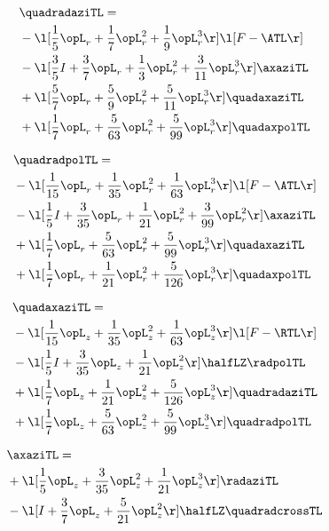 \begin{alignat}{2} 
\label{eq:quadradaziTL_0} 
& \quadradaziTL = \\ 
& - \l[ \frac{1}{5} \opL_r + \frac{1}{7} \opL_r^{2} + \frac{1}{9} \opL_r^{3}  \r] \l[ F - \ATL \r] \nonumber \\ 
& - \l[ \frac{3}{5} I + \frac{3}{7} \opL_r + \frac{1}{3} \opL_r^{2} + \frac{3}{11} \opL_r^{3}  \r] \axaziTL \nonumber \\ 
& + \l[ \frac{5}{7} \opL_r + \frac{5}{9} \opL_r^{2} + \frac{5}{11} \opL_r^{3}  \r] \quadaxaziTL \nonumber \\ 
& + \l[ \frac{1}{7} \opL_r + \frac{5}{63} \opL_r^{2} + \frac{5}{99} \opL_r^{3}  \r] \quadaxpolTL \nonumber \\ 
\end{alignat} 


\begin{alignat}{2} 
\label{eq:quadradpolTL_0} 
& \quadradpolTL = \\ 
& - \l[ \frac{1}{15} \opL_r + \frac{1}{35} \opL_r^{2} + \frac{1}{63} \opL_r^{3}  \r] \l[ F - \ATL \r] \nonumber \\ 
& - \l[ \frac{1}{5} I + \frac{3}{35} \opL_r + \frac{1}{21} \opL_r^{2} + \frac{3}{99} \opL_r^{2}  \r] \axaziTL \nonumber \\ 
& + \l[ \frac{1}{7} \opL_r + \frac{5}{63} \opL_r^{2} + \frac{5}{99} \opL_r^{3}  \r] \quadaxaziTL \nonumber \\ 
& + \l[ \frac{1}{7} \opL_r + \frac{1}{21} \opL_r^{2} + \frac{5}{126} \opL_r^{3}  \r] \quadaxpolTL \nonumber \\ 
\end{alignat} 


\begin{alignat}{2} 
\label{eq:quadaxaziTL_0} 
& \quadaxaziTL = \\ 
& - \l[ \frac{1}{15} \opL_z + \frac{1}{35} \opL_z^{2} + \frac{1}{63} \opL_z^{3}  \r] \l[ F - \RTL \r] \nonumber \\ 
& - \l[ \frac{1}{5} I + \frac{3}{35} \opL_z + \frac{1}{21} \opL_z^{2}  \r] \halfLZ \radpolTL \nonumber \\ 
& + \l[ \frac{1}{7} \opL_z + \frac{1}{21} \opL_z^{2} + \frac{5}{126} \opL_z^{3}  \r] \quadradaziTL \nonumber \\ 
& + \l[ \frac{1}{7} \opL_z + \frac{5}{63} \opL_z^{2} + \frac{5}{99} \opL_z^{3}  \r] \quadradpolTL \nonumber \\ 
\end{alignat} 


\begin{alignat}{2} 
\label{eq:linaxaziTL_0} 
& \axaziTL = \\ 
& + \l[ \frac{1}{5} \opL_z + \frac{3}{35} \opL_z^{2} + \frac{1}{21} \opL_z^{3}  \r] \radaziTL \nonumber \\ 
& - \l[ I + \frac{3}{7} \opL_z + \frac{5}{21} \opL_z^{2}  \r] \halfLZ \quadradcrossTL \nonumber \\ 
\end{alignat} 


